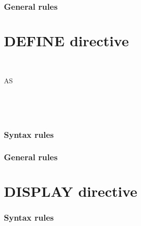 \subsubsection{General rules}

\section{DEFINE directive}

\begin{syntax}
  \begin{1=}
    \directiveindicator \\
    \miscext{\textdollar}
  \end{1=}
   AS
  \begin{1=}
    \begin{1=}
      \literal \\
    \end{1=}
    \begin{0-1}
    \end{0-1} \\
  \end{1=}
\end{syntax}

\subsubsection{Syntax rules}

\subsubsection{General rules}

\section{DISPLAY directive}

\begin{syntax}
\end{syntax}

\subsubsection{Syntax rules}

